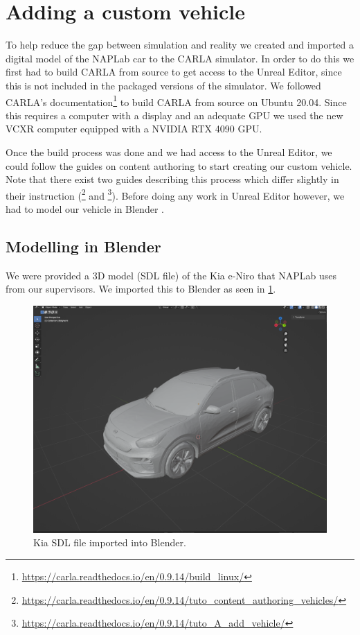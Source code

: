 \section{Adding a custom vehicle}
\label{sec:custom-vehicle}

To help reduce the gap between simulation and reality we created and imported a digital model of the NAPLab car to the CARLA simulator. In order to do this we first had to build CARLA from source to get access to the Unreal Editor, since this is not included in the packaged versions of the simulator. We followed CARLA's documentation\footnote{\url{https://carla.readthedocs.io/en/0.9.14/build_linux/}} to build CARLA from source on Ubuntu 20.04. Since this requires a computer with a display and an adequate GPU we used the new VCXR computer equipped with a NVIDIA RTX 4090 GPU.

Once the build process was done and we had access to the Unreal Editor, we could follow the guides on content authoring to start creating our custom vehicle. Note that there exist two guides describing this process which differ slightly in their instruction (\footnote{\url{https://carla.readthedocs.io/en/0.9.14/tuto_content_authoring_vehicles/}} and \footnote{\url{https://carla.readthedocs.io/en/0.9.14/tuto_A_add_vehicle/}}). Before doing any work in Unreal Editor however, we had to model our vehicle in Blender \cite{blender}.


\subsection{Modelling in Blender}

We were provided a 3D model (SDL file) of the Kia e-Niro that NAPLab uses from our supervisors. We imported this to Blender as seen in \cref{fig:blender-kia}.

\begin{figure}[h!]
    \centering
    \includegraphics[width=.8\textwidth]{chapters/3-method/figures/blender-kia.png}
    \caption{Kia SDL file imported into Blender.}
    \label{fig:blender-kia}
\end{figure}

